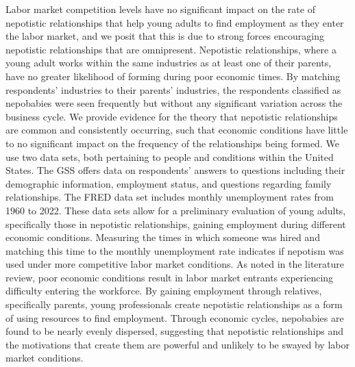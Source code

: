 \documentclass[12pt]{article}
\begin{document}
Labor market competition levels have no significant impact on the rate of nepotistic relationships that help young adults to find employment as they enter the labor market, and we posit that this is due to strong forces encouraging nepotistic relationships that are omnipresent. Nepotistic relationships, where a young adult works within the same industries as at least one of their parents, have no greater likelihood of forming during poor economic times. By matching respondents’ industries to their parents’ industries, the respondents classified as nepobabies were seen frequently but without any significant variation across the business cycle. We provide evidence for the theory that nepotistic relationships are common and consistently occurring, such that economic conditions have little to no significant impact on the frequency of the relationships being formed. 
We use two data sets, both pertaining to people and conditions within the United States. The GSS offers data on respondents' answers to questions including their demographic information, employment status, and questions regarding family relationships. The FRED data set includes monthly unemployment rates from 1960 to 2022. These data sets allow for a preliminary evaluation of young adults, specifically those in nepotistic relationships, gaining employment during different economic conditions.
Measuring the times in which someone was hired and matching this time to the monthly unemployment rate indicates if nepotism was used under more competitive labor market conditions. As noted in the literature review, poor economic conditions result in labor market entrants experiencing difficulty entering the workforce. By gaining employment through relatives, specifically parents, young professionals create nepotistic relationships as a form of using resources to find employment. Through economic cycles, nepobabies are found to be nearly evenly dispersed, suggesting that nepotistic relationships and the motivations that create them are powerful and unlikely to be swayed by labor market conditions. 



\newpage
\singlespacing
\setlength\bibsep{1pt}




\end{document}
